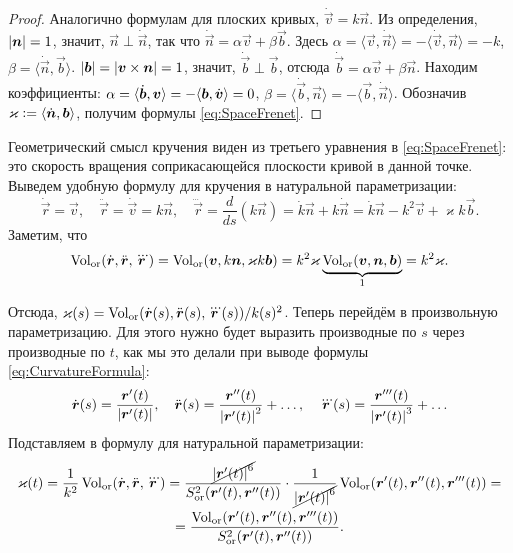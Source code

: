 \begin{proof}
	Аналогично формулам для плоских кривых, $\dot{\vec{v}} = k\vec{n}$. Из определения, $\abs{\vec{n}} = 1$, значит, $\vec{n} \perp \dot{\vec{n}}$, так что $\dot{\vec{n}} = \alpha\vec{v} + \beta\vec{b}$. Здесь $\alpha = \langle\vec{v}, \dot{\vec{n}}\rangle = -\langle\dot{\vec{v}}, \vec{n}\rangle = -k$, $\beta = \langle\dot{\vec{n}}, \vec{b}\rangle$. $\abs{\vec{b}} = \abs{\vec{v} \times \vec{n}} = 1$, значит, $\dot{\vec{b}} \perp \vec{b}$, отсюда $\dot{\vec{b}} = \alpha\vec{v} + \beta\vec{n}$. Находим коэффициенты: $\alpha = \langle \dot{\vec{b}}, \vec{v} \rangle \hm= -\langle\vec{b}, \dot{\vec{v}}\rangle = 0$, $\beta = \langle\dot{\vec{b}}, \vec{n}\rangle = -\langle \vec{b}, \dot{\vec{n}}\rangle$. Обозначив $\varkappa \vcentcolon = \langle\dot{\vec{n}}, \vec{b}\rangle$, получим формулы \eqref{eq:SpaceFrenet}.
\end{proof}

Геометрический смысл кручения виден из третьего уравнения в \eqref{eq:SpaceFrenet}: это скорость вращения соприкасающейся плоскости кривой в данной точке. Выведем удобную формулу для кручения в натуральной параметризации:
\[
	\dot{\vec{r}} = \vec{v},\quad \ddot{\vec{r}} = \dot{\vec{v}} = k\vec{n},\quad \dddot{\vec{r}} = \frac{d}{ds}(k\vec{n}) = \dot{k}\vec{n} + k\dot{\vec{n}} = \dot{k}\vec{n} - k^2\vec{v} + \varkappa k\vec{b}.
\]
Заметим, что
\[
	\Vol_{\Or}(\dot{\vec{r}}, \ddot{\vec{r}}, \dddot{\vec{r}}) = \Vol_{\Or}(\vec{v}, k\vec{n}, \varkappa k\vec{b}) = k^2\varkappa \underbrace{\Vol_{\Or}(\vec{v}, \vec{n}, \vec{b})}_1 = k^2\varkappa.
\]

Отсюда, $\varkappa(s) = \Vol_{\Or}(\dot{\vec{r}}(s), \ddot{\vec{r}}(s), \dddot{\vec{r}}(s)) / k(s)^2$. Теперь перейдём в произвольную параметризацию. Для этого нужно будет выразить производные по $s$ через производные по $t$, как мы это делали при выводе формулы \eqref{eq:CurvatureFormula}:
\[
	\dot{\vec{r}}(s) = \frac{\vec{r}^\prime(t)}{\abs{\vec{r}^\prime(t)}},\quad \ddot{\vec{r}}(s) = \frac{\vec{r}^{\prime\prime}(t)}{\abs{\vec{r}^\prime(t)}^2}+ \ldots,\quad \dddot{\vec{r}}(s) = \frac{\vec{r}^{\prime\prime\prime}(t)}{\abs{\vec{r}^\prime(t)}^3} + \ldots
\]
Подставляем в формулу для натуральной параметризации:
\begin{multline} \label{eq:TorsionFormula}
	\varkappa(t) = \frac{1}{k^2}\Vol_{\Or}(\dot{\vec{r}}, \ddot{\vec{r}}, \dddot{\vec{r}}) = \frac{\cancel{\abs{\vec{r}^\prime(t)}^6}}{S^2_{\Or}(\vec{r}^\prime(t), \vec{r}^{\prime\prime}(t))} \cdot \frac{1}{\cancel{\abs{\vec{r}^\prime(t)}^6}}\Vol_{\Or}(\vec{r}^\prime(t), \vec{r}^{\prime\prime}(t), \vec{r}^{\prime\prime\prime}(t)) =\\ = \frac{\Vol_{\Or}(\vec{r}^\prime(t), \vec{r}^{\prime\prime}(t), \vec{r}^{\prime\prime\prime}(t))}{S^2_{\Or}(\vec{r}^\prime(t), \vec{r}^{\prime\prime}(t))}.
\end{multline}

